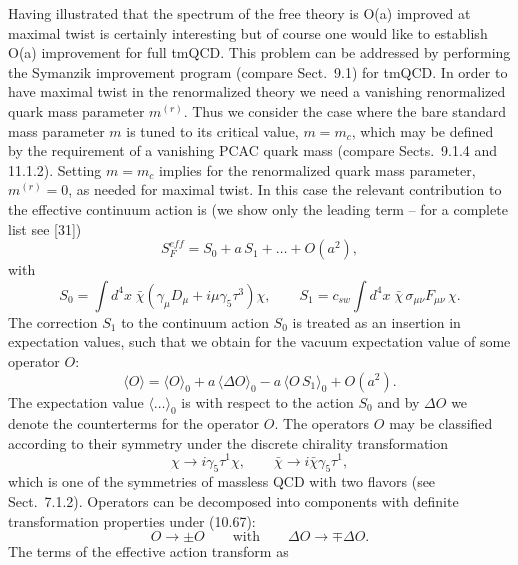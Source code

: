 Having illustrated that the spectrum of the free theory is O(a) improved at
maximal twist is certainly interesting but of course one would like to
establish O(a) improvement for full tmQCD. This problem can be addressed by
performing the Symanzik improvement program (compare Sect.~9.1) for tmQCD. In
order to have maximal twist in the renormalized theory we need a vanishing
renormalized quark mass parameter $m^{(r)}$. Thus we consider the case where
the bare standard mass parameter $m$ is tuned to its critical value,
$m = m_c$, which may be defined by the requirement of a vanishing PCAC quark
mass (compare Sects.~9.1.4 and 11.1.2). Setting $m = m_c$ implies for the
renormalized quark mass parameter, $m^{(r)} = 0$, as needed for maximal twist.
In this case the relevant contribution to the effective continuum action is
(we show only the leading term -- for a complete list see [31])
\begin{equation}
  S_F^{eff} = S_0 + a\,S_1 + \ldots + O(a^2) ,
\end{equation}
with
\begin{equation}
  S_0 = \int d^4x\;
  \bar\chi\left(\gamma_\mu D_\mu + i\mu\gamma_5\tau^3\right)\chi , \qquad
  S_1 = c_{sw}\int d^4x\; \bar\chi\,\sigma_{\mu\nu}F_{\mu\nu}\,\chi .
\end{equation}
The correction $S_1$ to the continuum action $S_0$ is treated as an insertion
in expectation values, such that we obtain for the vacuum expectation value of
some operator $O$:
\begin{equation}
  \langle O\rangle = \langle O\rangle_0 + a\,\langle\Delta O\rangle_0
  - a\,\langle O\,S_1\rangle_0 + O(a^2) .
\end{equation}
The expectation value $\langle\ldots\rangle_0$ is with respect to the action
$S_0$ and by $\Delta O$ we denote the counterterms for the operator $O$. The
operators $O$ may be classified according to their symmetry under the discrete
chirality transformation
\begin{equation}
  \chi \longrightarrow i\gamma_5\tau^1\chi , \qquad
  \bar\chi \longrightarrow i\bar\chi\gamma_5\tau^1 ,
\end{equation}
which is one of the symmetries of massless QCD with two flavors (see
Sect.~7.1.2). Operators can be decomposed into components with definite
transformation properties under (10.67):
\begin{equation}
  O \longrightarrow \pm O \qquad \text{with} \qquad
  \Delta O \longrightarrow \mp\Delta O .
\end{equation}
The terms of the effective action transform as
